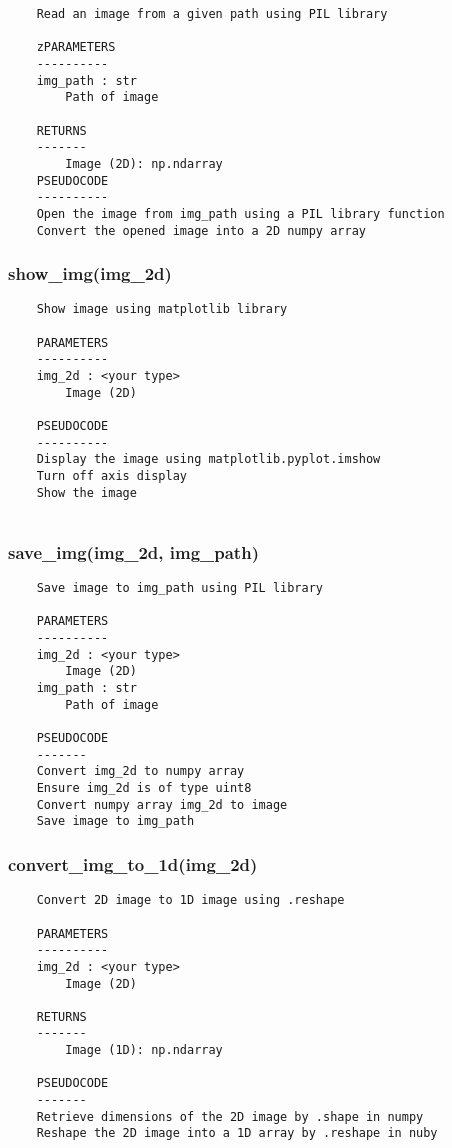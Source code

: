 \begin{verbatim}
    Read an image from a given path using PIL library

    zPARAMETERS
    ----------
    img_path : str
        Path of image

    RETURNS
    -------
        Image (2D): np.ndarray
    PSEUDOCODE
    ----------
    Open the image from img_path using a PIL library function
    Convert the opened image into a 2D numpy array
\end{verbatim}

\subsubsection{show\_img(img\_2d)}
\begin{verbatim}
    Show image using matplotlib library

    PARAMETERS
    ----------
    img_2d : <your type>
        Image (2D)
    
    PSEUDOCODE
    ----------
    Display the image using matplotlib.pyplot.imshow
    Turn off axis display
    Show the image
    
\end{verbatim}
\subsubsection{save\_img(img\_2d, img\_path)}
\begin{verbatim}
    Save image to img_path using PIL library

    PARAMETERS
    ----------
    img_2d : <your type>
        Image (2D)
    img_path : str
        Path of image
    
    PSEUDOCODE
    -------
    Convert img_2d to numpy array
    Ensure img_2d is of type uint8
    Convert numpy array img_2d to image
    Save image to img_path
\end{verbatim}
\subsubsection{convert\_img\_to\_1d(img\_2d)}
\begin{verbatim}
    Convert 2D image to 1D image using .reshape

    PARAMETERS
    ----------
    img_2d : <your type>
        Image (2D)

    RETURNS
    -------
        Image (1D): np.ndarray

    PSEUDOCODE
    -------
    Retrieve dimensions of the 2D image by .shape in numpy
    Reshape the 2D image into a 1D array by .reshape in nuby
\end{verbatim}
